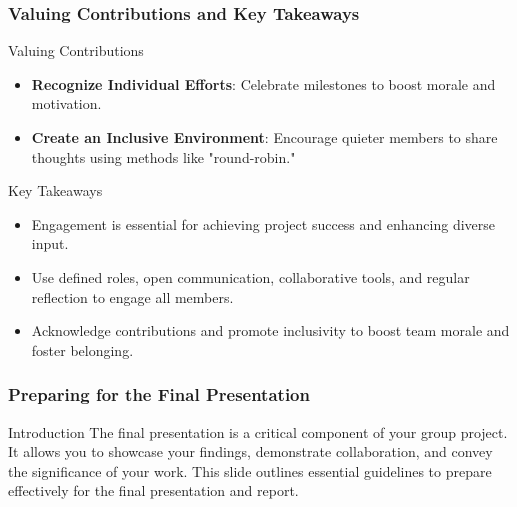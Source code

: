\documentclass[aspectratio=169]{beamer}
\begin{document}
\begin{frame}[fragile]
    \frametitle{Valuing Contributions and Key Takeaways}
    \begin{block}{Valuing Contributions}
        \begin{itemize}
            \item \textbf{Recognize Individual Efforts}: Celebrate milestones to boost morale and motivation.
            \item \textbf{Create an Inclusive Environment}: Encourage quieter members to share thoughts using methods like "round-robin."
        \end{itemize}
    \end{block}
    \begin{block}{Key Takeaways}
        \begin{itemize}
            \item Engagement is essential for achieving project success and enhancing diverse input.
            \item Use defined roles, open communication, collaborative tools, and regular reflection to engage all members.
            \item Acknowledge contributions and promote inclusivity to boost team morale and foster belonging.
        \end{itemize}
    \end{block}
\end{frame}

\begin{frame}[fragile]
    \frametitle{Preparing for the Final Presentation}
    \begin{block}{Introduction}
        The final presentation is a critical component of your group project. It allows you to showcase your findings, demonstrate collaboration, and convey the significance of your work. This slide outlines essential guidelines to prepare effectively for the final presentation and report.
    \end{block}
\end{frame}
\end{document}
